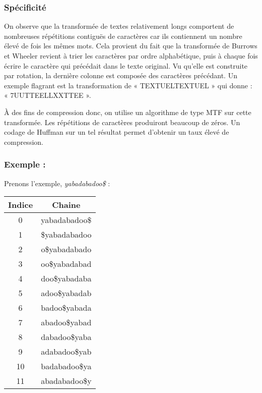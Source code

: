 \subsubsection{Spécificité}
On observe que la transformée de textes relativement longs comportent de nombreuses répétitions contiguës de caractères car ils contiennent un nombre élevé de fois les mêmes mots. Cela provient du fait que la transformée de Burrows et Wheeler revient à trier les caractères par ordre alphabétique, puis à chaque fois écrire le caractère qui précédait dans le texte original. Vu qu'elle est construite par rotation, la dernière colonne est composée des caractères précédant. Un exemple flagrant est la transformation de « TEXTUELTEXTUEL » qui donne : « 7UUTTEELLXXTTEE ».

À des fins de compression donc, on utilise un algorithme de type MTF sur cette transformée. Les répétitions de caractères produiront beaucoup de zéros. Un codage de Huffman sur un tel résultat permet d'obtenir un taux élevé de compression. 

\subsubsection{Exemple :}
\par Prenons l'exemple, \textit{yabadabadoo\$} : \\ 


\begin{tabular}{|c|c|}
    \hline
    Indice & Chaine \\
    \hline
    0 & yabadabadoo\$\\
    \hline
    1 & \$yabadabadoo\\
    \hline
    2 & o\$yabadabado\\
    \hline
    3 & oo\$yabadabad\\
    \hline
    4 & doo\$yabadaba\\
    \hline
    5 & adoo\$yabadab\\
    \hline
    6 & badoo\$yabada\\
    \hline
    7 & abadoo\$yabad\\
    \hline
    8 & dabadoo\$yaba\\
    \hline
    9 & adabadoo\$yab\\
    \hline
    10 & badabadoo\$ya\\
    \hline
    11 & abadabadoo\$y\\
    \hline
\end{tabular}



